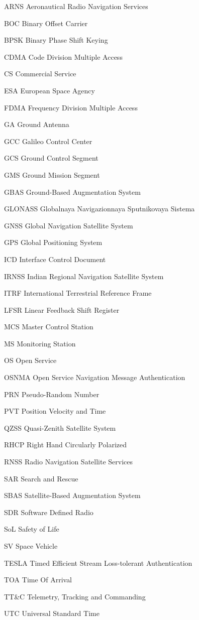\begin{abbreviations}

\item[ARNS] Aeronautical Radio Navigation Services
\item[BOC] Binary Offset Carrier
\item[BPSK] Binary Phase Shift Keying
\item[CDMA] Code Division Multiple Access
\item[CS] Commercial Service
\item[ESA] European Space Agency
\item[FDMA] Frequency Division Multiple Access
\item[GA] Ground Antenna
\item[GCC] Galileo Control Center
\item[GCS] Ground Control Segment
\item[GMS] Ground Mission Segment 
\item[GBAS] Ground-Based Augmentation System
\item[GLONASS] Globalnaya Navigazionnaya Sputnikovaya Sistema
\item[GNSS] Global Navigation Satellite System
\item[GPS] Global Positioning System
\item[ICD] Interface Control Document
\item[IRNSS] Indian Regional Navigation Satellite System
\item[ITRF] International Terrestrial Reference Frame
\item[LFSR] Linear Feedback Shift Register
\item[MCS] Master Control Station
\item[MS] Monitoring Station
\item[OS] Open Service
\item[OSNMA] Open Service Navigation Message Authentication
\item[PRN] Pseudo-Random Number
\item[PVT] Position Velocity and Time
\item[QZSS] Quasi-Zenith Satellite System
\item[RHCP] Right Hand Circularly Polarized
\item[RNSS] Radio Navigation Satellite Services
\item[SAR] Search and Rescue
\item[SBAS] Satellite-Based Augmentation System
\item[SDR] Software Defined Radio
\item[SoL] Safety of Life
\item[SV] Space Vehicle
\item[TESLA] Timed Efficient Stream Loss-tolerant Authentication
\item[TOA] Time Of Arrival
\item[TT&C] Telemetry, Tracking and Commanding
\item[UTC] Universal Standard Time

\end{abbreviations}
